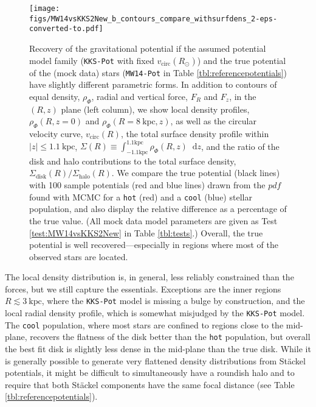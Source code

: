 \documentclass[iop,revtex4,numberedappendix,appendixfloats]{emulateapj}
\newcommand*\diff{\mathop{}\!\mathrm{d}}
\newcommand{\pdf}{\ensuremath{pdf}}
\begin{document}
\begin{figure*}[!htb]
\centering
\texttt{[image: figs/MW14vsKKS2New\_b\_contours\_compare\_withsurfdens\_2-eps-converted-to.pdf]}
\caption{Recovery of the gravitational potential if the assumed potential model family (\texttt{KKS-Pot} with fixed $v_\text{circ}(R_\odot)$) and the true potential of the (mock data) stars (\texttt{MW14-Pot} in Table \ref{tbl:referencepotentials}) have slightly different parametric forms. In addition to contours of equal density, $\rho_\Phi$, radial and vertical force, $F_R$ and $F_z$, in the $(R,z)$ plane (left column), we show local density profiles, $\rho_\Phi(R,z=0)$ and $\rho_\Phi(R=8~\text{kpc},z)$, as well as the circular velocity curve, $v_\text{circ}(R)$, the total surface density profile within $|z|\leq1.1~\text{kpc}$, $\Sigma(R) \equiv \int_{-1.1\text{kpc}}^{1.1\text{kpc}}\rho_\Phi(R,z)\diff z$, and the ratio of the disk and halo contributions to the total surface density, $\Sigma_\text{disk}(R)/\Sigma_\text{halo}(R)$. We compare the true potential (black lines) with 100 sample potentials (red and blue lines) drawn from the \pdf{} found with MCMC for a \texttt{hot} (red) and a \texttt{cool} (blue) stellar population, and also display the relative difference as a percentage of the true value. (All mock data model parameters are given as Test \ref{test:MW14vsKKS2New} in Table \ref{tbl:tests}.) Overall, the true potential is well recovered---especially in regions where most of the observed stars are located.}
\label{fig:MW14vsKKS2New_contours}
\end{figure*}

The local density distribution is, in general, less reliably constrained than the forces, but we still capture the essentials. Exceptions are the inner regions $R\lesssim3~\text{kpc}$, where the \texttt{KKS-Pot} model is missing a bulge by construction, and the local radial density profile, which is somewhat misjudged by the \texttt{KKS-Pot} model. The \texttt{cool} population, where most stars are confined to regions close to the mid-plane, recovers the flatness of the disk better than the \texttt{hot} population, but overall the best fit disk is slightly less dense in the mid-plane than the true disk. While it is generally possible to generate very flattened density distributions from St\"{a}ckel potentials, it might be difficult to simultaneously have a roundish halo and to require that both St\"{a}ckel components have the same focal distance (see Table \ref{tbl:referencepotentials}).
\end{document}

